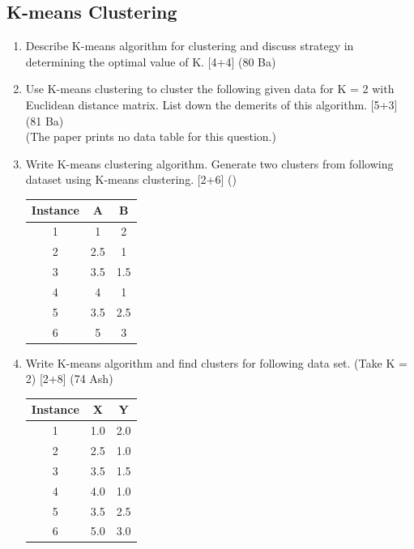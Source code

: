 \documentclass[12pt]{article}
\begin{document}
  \subsection{K-means Clustering}
    \begin{enumerate}[topsep=0pt, noitemsep]
      \item Describe K-means algorithm for clustering and discuss strategy in determining the optimal value of K. \hfill [4+4] (80 Ba)

      \item Use K-means clustering to cluster the following given data for K = 2 with Euclidean distance matrix. List down the demerits of this algorithm. \hfill [5+3] (81 Ba)\\
        (The paper prints no data table for this question.)

      \item Write K-means clustering algorithm. Generate two clusters from following dataset using K-means clustering. \hfill [2+6] ()\\
        \small
        \begin{tabular}{|c|c|c|}
          \hline
          Instance & A & B \\ \hline
          1 & 1 & 2 \\ \hline
          2 & 2.5 & 1 \\ \hline
          3 & 3.5 & 1.5 \\ \hline
          4 & 4 & 1 \\ \hline
          5 & 3.5 & 2.5 \\ \hline
          6 & 5 & 3 \\ \hline
        \end{tabular}
        \normalsize

      \item Write K-means algorithm and find clusters for following data set. (Take K = 2) \hfill [2+8] (74 Ash)\\
        \small
        \begin{tabular}{|c|c|c|}
          \hline
          Instance & X & Y \\ \hline
          1 & 1.0 & 2.0 \\ \hline
          2 & 2.5 & 1.0 \\ \hline
          3 & 3.5 & 1.5 \\ \hline
          4 & 4.0 & 1.0 \\ \hline
          5 & 3.5 & 2.5 \\ \hline
          6 & 5.0 & 3.0 \\ \hline
        \end{tabular}
        \normalsize


\end{enumerate}
\end{document}
